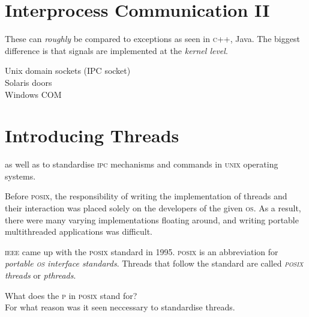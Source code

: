 \section{Interprocess Communication II}



These can \textit{roughly} be compared to exceptions as seen in \textsc{c}++, Java.
The biggest difference is that signals are implemented at the \textit{kernel level}. 


Unix domain sockets (IPC socket) \\
Solaris doors \\
Windows COM \\


\section{Introducing Threads}

as well as to standardise \textsc{ipc} mechanisms and commands 
in \textsc{unix} operating systems.

Before \textsc{posix}, the responsibility of writing the
implementation of threads and their interaction was placed 
solely on the developers of the given \textsc{os}. 
As a result, there were many varying implementations floating around, 
and writing portable multithreaded applications was difficult.

\textsc{ieee} came up with the \textsc{posix} standard in 1995. 
\textsc{posix} is an abbreviation for 
\textit{portable \textsc{os} interface standards}.
Threads that follow the standard are called 
\textit{\textsc{posix} threads} or \textit{pthreads}.

\begin{example}
What does the \textsc{p} in \textsc{posix} stand for? \\
For what reason was it seen neccessary to standardise threads.
\end{example}